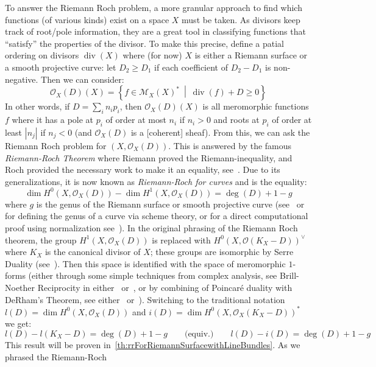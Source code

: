 \documentclass{book}
\newcommand{\CM}{{\mathcal{M}}}
\newcommand{\CO}{{\mathcal{O}}}
\renewcommand{\div}{{\operatorname{div}}}
\newcommand{\set}[2]{\left\{#1 \ \middle|\ #2\right\}}
\begin{document}
To answer the Riemann Roch problem, a more granular approach to find which functions (of various kinds) exist
on a space $X$ must be taken. As divisors keep track of root/pole information, they are a great tool in
classifying functions that ``satisfy'' the properties of the divisor. To make this precise, define a patial ordering on
divisors $\div(X)$ where (for now) $X$ is either a Riemann surface or a smooth projective curve: let $D_2
\ge D_1$ if each coefficient of $D_2 - D_1$ is non-negative. Then we can consider:
\[
  \CO_X(D)(X) = \set{f \in \CM_X(X)^*}{\div(f) + D \ge 0}
\]
In other words, if $D =\sum_i n_ip_i$, then $\CO_X(D)(X)$ is all meromorphic functions $f$ where it has a pole
at $p_i$ of order at most $n_i$ if $n_i > 0$ and roots at $p_i$ of order at least $|n_j|$ if $n_j < 0$ (and
$\CO_X(D)$ is a [coherent] sheaf). From this, we can ask the Riemann Roch problem for $(X, \CO_X(D))$. This is
answered by the famous \emph{Riemann-Roch Theorem} where Riemann proved the Riemann-inequality, and Roch
provided the necessary work to make it an equality, see~\cite{a.griffithsIntroductionAlgebraicCurves}. Due to
its generalizations, it is now known as \emph{Riemann-Roch for curves} and is the equality:
\begin{equation}\label{eq:riemannRoch1dIntro}
  \dim H^0(X, \CO_X(D)) - \dim H^1(X, \CO_X(D)) = \deg(D)+1-g
\end{equation}
where $g$ is the genus of the Riemann surface or smooth projective curve
(see~\cite{hartshorneAlgebraicGeometry2013} or~\cite{NateAlgGeo} for defining the genus of a curve via scheme
theory, or for a
direct computational proof using normalization see~\cite{NateComplexAnalysis}). In the original phrasing of the Riemann Roch
theorem, the group $H^1(X, \CO_X(D))$ is replaced with  $H^0(X, \CO(K_X-D))^\vee$ where $K_X$ is the canonical
divisor of $X$; these groups are isomorphic by Serre Duality (see~\cite[section~6.3]{NateAlgGeo}). Then this
space is identified with the space of meromorphic $1$-forms (either through some simple techniques from
complex analysis, see Brill-Noether Reciprocity in either~\cite{a.griffithsIntroductionAlgebraicCurves}
or~\cite{NateComplexAnalysis}, or by combining of Poincar\'e duality with DeRham's Theorem, see
either~\cite{leeIntroductionRiemannianManifolds2018} or~\cite{NateDiffGeo}). Switching to the traditional
notation $l(D) = \dim H^0(X, \CO_X(D))$ and $i(D) = \dim H^0(X, \CO_X(K_X-D))^*$ we get:
\[
  l(D) - l(K_X-D) = \deg(D) + 1-g \qquad \text{(equiv.)} \qquad l(D) - i(D) = \deg(D) + 1-g
\]
This result will be proven in~\cref{th:rrForRiemannSurfacewithLineBundles}. As we phrased the Riemann-Roch
\end{document}
